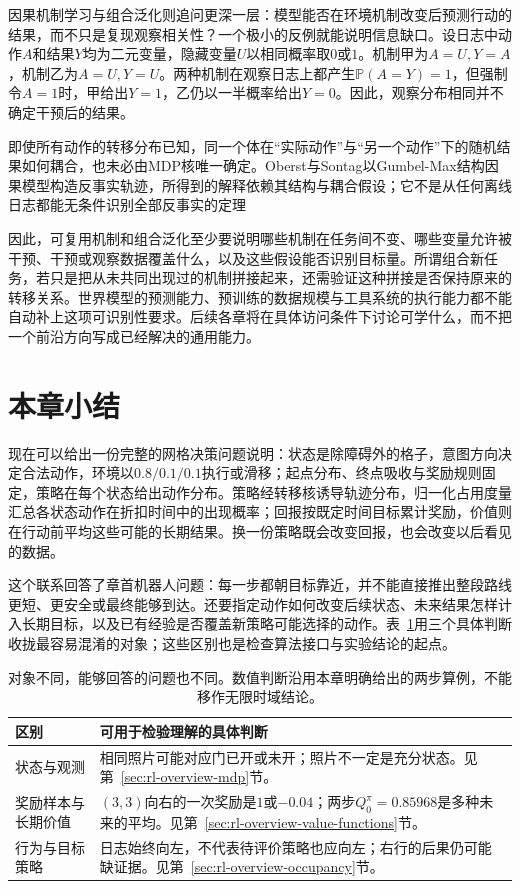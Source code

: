 因果机制学习与组合泛化则追问更深一层：模型能否在环境机制改变后预测行动的结果，而不只是复现观察相关性？一个极小的反例就能说明信息缺口。设日志中动作$A$和结果$Y$均为二元变量，隐藏变量$U$以相同概率取$0$或$1$。机制甲为$A=U,Y=A$，机制乙为$A=U,Y=U$。两种机制在观察日志上都产生$\mathbb P(A=Y)=1$，但强制令$A=1$时，甲给出$Y=1$，乙仍以一半概率给出$Y=0$。因此，观察分布相同并不确定干预后的结果。

即使所有动作的转移分布已知，同一个体在“实际动作”与“另一个动作”下的随机结果如何耦合，也未必由MDP核唯一确定。Oberst与Sontag以Gumbel-Max结构因果模型构造反事实轨迹，所得到的解释依赖其结构与耦合假设；它不是从任何离线日志都能无条件识别全部反事实的定理

因此，可复用机制和组合泛化至少要说明哪些机制在任务间不变、哪些变量允许被干预、干预或观察数据覆盖什么，以及这些假设能否识别目标量。所谓组合新任务，若只是把从未共同出现过的机制拼接起来，还需验证这种拼接是否保持原来的转移关系。世界模型的预测能力、预训练的数据规模与工具系统的执行能力都不能自动补上这项可识别性要求。后续各章将在具体访问条件下讨论可学什么，而不把一个前沿方向写成已经解决的通用能力。

\section{本章小结}
\label{sec:rl-overview-summary}

现在可以给出一份完整的网格决策问题说明：状态是除障碍外的格子，意图方向决定合法动作，环境以$0.8/0.1/0.1$执行或滑移；起点分布、终点吸收与奖励规则固定，策略在每个状态给出动作分布。策略经转移核诱导轨迹分布，归一化占用度量汇总各状态动作在折扣时间中的出现概率；回报按既定时间目标累计奖励，价值则在行动前平均这些可能的长期结果。换一份策略既会改变回报，也会改变以后看见的数据。

这个联系回答了章首机器人问题：每一步都朝目标靠近，并不能直接推出整段路线更短、更安全或最终能够到达。还要指定动作如何改变后续状态、未来结果怎样计入长期目标，以及已有经验是否覆盖新策略可能选择的动作。表~\ref{tab:rl-overview-distinctions}用三个具体判断收拢最容易混淆的对象；这些区别也是检查算法接口与实验结论的起点。

\begin{table}[htbp]
  \centering\small
  \begin{tabularx}{\linewidth}{@{}>{\raggedright\arraybackslash}p{25mm}>{\raggedright\arraybackslash}X@{}}
    \toprule
    区别 & 可用于检验理解的具体判断\\
    \midrule
    状态与观测 & 相同照片可能对应门已开或未开；照片不一定是充分状态。见第~\ref{sec:rl-overview-mdp}节。\\
    奖励样本与长期价值 & $(3,3)$向右的一次奖励是$1$或$-0.04$；两步$Q_0^\pi=0.85968$是多种未来的平均。见第~\ref{sec:rl-overview-value-functions}节。\\
    行为与目标策略 & 日志始终向左，不代表待评价策略也应向左；右行的后果仍可能缺证据。见第~\ref{sec:rl-overview-occupancy}节。\\
    \bottomrule
  \end{tabularx}
  \caption{对象不同，能够回答的问题也不同。数值判断沿用本章明确给出的两步算例，不能移作无限时域结论。}
  \label{tab:rl-overview-distinctions}
\end{table}

